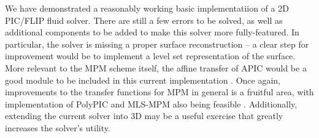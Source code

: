 \documentclass[sigconf]{acmart}
\begin{document}
We have demonstrated a reasonably working basic implementatiion of a 2D PIC/FLIP fluid solver. There are still a few errors to be solved, as well as additional components to be added to make this solver more fully-featured. In particular, the solver is missing a proper surface reconstruction -- a clear step for improvement would be to implement a level set representation of the surface. More relevant to the MPM scheme itself, the affine transfer of APIC would be a good module to be included in this current implementation \cite{jiang2015}. Once again, improvements to the transfer functions for MPM in general is a fruitful area, with implementation of PolyPIC and MLS-MPM also being feasible \cite{fu2017, hu2018}. Additionally, extending the current solver into 3D may be a useful exercise that greatly increases the solver's utility.



\end{document}
